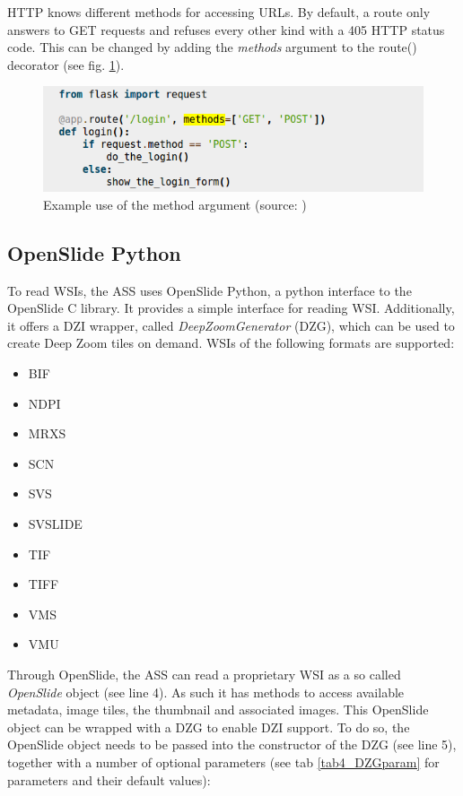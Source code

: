 HTTP knows different methods for accessing URLs. By default, a route only answers to GET requests and refuses every other kind with a 405 HTTP status code. This can be changed by adding the \emph{methods} argument to the route() decorator (see fig. \ref{fig4_methods})\cite{web:flask}.

\begin{figure}[H]
	\begin{center}
		\includegraphics[scale=0.5]{img/HTTPmethods.png}
		\caption{Example use of the method argument (source: \cite{web:flask})}
		\label{fig4_methods}
	\end{center}
\end{figure}


\subsection{OpenSlide Python}

To read WSIs, the ASS uses OpenSlide Python, a python interface to the OpenSlide C library. It provides a simple interface for reading WSI. Additionally, it offers a DZI wrapper\cite{web:openslide}, called \emph{DeepZoomGenerator} (DZG), which can be used to create Deep Zoom tiles on demand. WSIs of the following formats are supported:

\begin{itemize}
	\item BIF
	\item NDPI
	\item MRXS
	\item SCN
	\item SVS
	\item SVSLIDE
	\item TIF
	\item TIFF
	\item VMS
	\item VMU
\end{itemize}

Through OpenSlide, the ASS can read a proprietary WSI as a so called \emph{OpenSlide} object (see line 4). As such it has methods to access available metadata, image tiles, the thumbnail and associated images. This OpenSlide object can be wrapped with a DZG to enable DZI support\cite{web:openslide}. To do so, the OpenSlide object needs to be passed into the constructor of the DZG (see line 5), together with a number of optional parameters (see tab \ref{tab4_DZGparam} for parameters and their default values):

